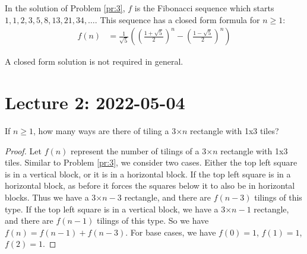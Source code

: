 \documentclass[12pt]{article}
\begin{document}
    \begin{myrem}{}{}
        In the solution of Problem \ref{pr:3}, $f$ is the Fibonacci sequence which starts $1, 1, 2, 3, 5, 8, 13, 21, 34, \dots$. This sequence has a closed form formula for $n\geq1$:
        \begin{align*}
            f(n)&=\frac{1}{\sqrt{5}}\left(\left(\frac{1+\sqrt{5}}{2}\right)^n-\left(\frac{1-\sqrt{5}}{2}\right)^n\right)
        \end{align*}

        A closed form solution is not required in general.
    \end{myrem}

    \section{Lecture 2: 2022-05-04}
    \begin{myprob}{}{}
        If $n\geq1$, how many ways are there of tiling a 3$\times n$ rectangle with 1x3 tiles?

        \begin{proof}
            Let $f(n)$ represent the number of tilings of a 3$\times n$ rectangle with 1x3 tiles. Similar to Problem \ref{pr:3}, we consider two cases. Either the top left square is in a vertical block, or it is in a horizontal block. If the top left square is in a horizontal block, as before it forces the squares below it to also be in horizontal blocks. Thus we have a 3$\times n-3$ rectangle, and there are $f(n-3)$ tilings of this type. If the top left square is in a vertical block, we have a 3$\times n-1$ rectangle, and there are $f(n-1)$ tilings of this type. So we have $f(n)=f(n-1)+f(n-3)$. For base cases, we have $f(0)=1$, $f(1)=1$, $f(2)=1$.
        \end{proof}
    \end{myprob}
\end{document}
